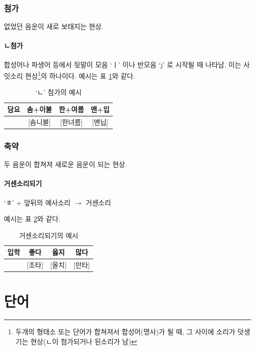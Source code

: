 \documentclass[10pt]{report}
\begin{document}
\subsection{첨가}
없었던 음운이 새로 보태지는 현상.
\subsubsection{ㄴ첨가}
합성어나 파생어 등에서 뒷말이 모음 `ㅣ' 이나 반모음 `j' 로 시작될 때 나타남. 이는 사잇소리 현상\footnote{두개의 형태소 또는 단어가 합쳐져서 합성어(명사)가 될 때, 그 사이에 소리가 덧생기는 현상(ㄴ이 첨가되거나 된소리가 남)}의 하나이다. 예시는 표 \ref{sickle_addition}와 같다.

\begin{table}
\begin{center}
	\begin{tabular}{|c|c|c|c|}
		\hline
		담요 & 솜+이불 & 한+여름 & 맨+입\\
		\hline
		[담뇨] & [솜니불] & [한녀름] & [맨닙]\\
		\hline
	\end{tabular}
	\caption{`ㄴ' 첨가의 예시}
	\label{sickle_addition}
\end{center}
\end{table}

\subsection{축약}
두 음운이 합쳐져 새로운 음운이 되는 현상.
\subsubsection{거센소리되기}
`ㅎ' + 앞뒤의 예사소리 $\rightarrow$ 거센소리

예시는 표 \ref{aspirated}와 같다.
\begin{table}
\begin{center}
	\begin{tabular}{|c|c|c|c|}
		\hline
		입학 & 좋다 & 옳지 & 많다 \\
		\hline
		[이팍] & [조타] & [올치] & [만타] \\ 
		\hline
	\end{tabular}
	\caption{거센소리되기의 예시}
	\label{aspirated}
\end{center}
\end{table}

\chapter{단어}
\end{document}
